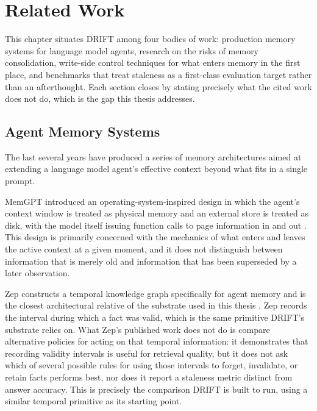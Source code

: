 \chapter{Related Work}
\label{chap:related-work}

This chapter situates DRIFT among four bodies of work: production memory systems for language model agents, research on the risks of memory consolidation, write-side control techniques for what enters memory in the first place, and benchmarks that treat staleness as a first-class evaluation target rather than an afterthought. Each section closes by stating precisely what the cited work does not do, which is the gap this thesis addresses.

\section{Agent Memory Systems}
\label{sec:related-memory-systems}

The last several years have produced a series of memory architectures aimed at extending a language model agent's effective context beyond what fits in a single prompt.

MemGPT introduced an operating-system-inspired design in which the agent's context window is treated as physical memory and an external store is treated as disk, with the model itself issuing function calls to page information in and out \citep{packer2023memgpt}. This design is primarily concerned with the mechanics of what enters and leaves the active context at a given moment, and it does not distinguish between information that is merely old and information that has been superseded by a later observation.

Zep constructs a temporal knowledge graph specifically for agent memory and is the closest architectural relative of the substrate used in this thesis \citep{rasmussen2025zep}. Zep records the interval during which a fact was valid, which is the same primitive DRIFT's substrate relies on. What Zep's published work does not do is compare alternative policies for acting on that temporal information: it demonstrates that recording validity intervals is useful for retrieval quality, but it does not ask which of several possible rules for using those intervals to forget, invalidate, or retain facts performs best, nor does it report a staleness metric distinct from answer accuracy. This is precisely the comparison DRIFT is built to run, using a similar temporal primitive as its starting point.

